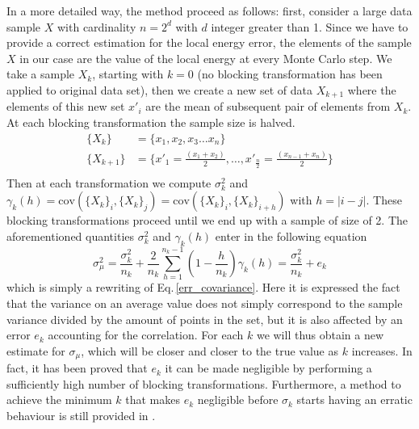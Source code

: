 In a more detailed way, the method proceed as follows: first, consider a large data sample $X$ with cardinality $n=2^d$ with $d$ integer greater than 1. Since we have to provide a correct estimation for the local energy error, the elements of the sample $X$ in our case are the value of the local energy at every Monte Carlo step. We take a sample $X_k$, starting with $k=0$ (no blocking transformation has been applied to original data set), then we create a new set of data $X_{k+1}$ where the elements of this new set $x'_i$ are the mean of subsequent pair of elements from $X_k$. At each blocking transformation the sample size is halved.
\begin{align*}
    \{X_k\} &= \{x_1, x_2, x_3 \dots x_n\} \\
    \{X_{k+1}\} &= \bigg\{x'_1=\frac{(x_1+x_2)}{2}, \dots , x'_{\frac{n}{2}}=\frac{(x_{n-1} + x_{n})}{2} \bigg\} \\
\end{align*}
Then at each transformation we compute $\sigma_k^2$ and $\gamma_k(h) = \text{cov}(\{X_k\}_i , \{X_k\}_j)=\text{cov}(\{X_k\}_i , \{X_k\}_{i+h})$ with $h =|i-j|$. These blocking transformations proceed until we end up with a sample of size of 2. The aforementioned quantities $\sigma_k^2$ and $\gamma_k(h)$ enter in the following equation
\begin{equation}
    \sigma_{\mu}^2 = \frac{\sigma_k^2}{n_k} + \frac{2}{n_k}\sum_{h=1}^{n_k - 1} \left(1-\frac{h}{n_k}\right)\gamma_k(h) = \frac{\sigma_k^2}{n_k} +e_k
    \label{eq:blocking_method}
\end{equation}
which is simply a rewriting of Eq.\,\ref{err_covariance}. Here it is expressed the fact that the variance on an average value does not simply correspond to the sample variance divided by the amount of points in the set, but it is also affected by an error $e_k$ accounting for the correlation. For each $k$ we will thus obtain a new estimate for $\sigma_{\mu}$, which will be closer and closer to the true value as $k$ increases. In fact, it has been proved \cite{Marius} that $e_k$ it can be made negligible by performing a sufficiently high number of blocking transformations. Furthermore, a method to achieve the minimum $k$ that makes $e_k$ negligible before $\sigma_k$ starts having an erratic behaviour is still provided in \cite{Marius}. 

